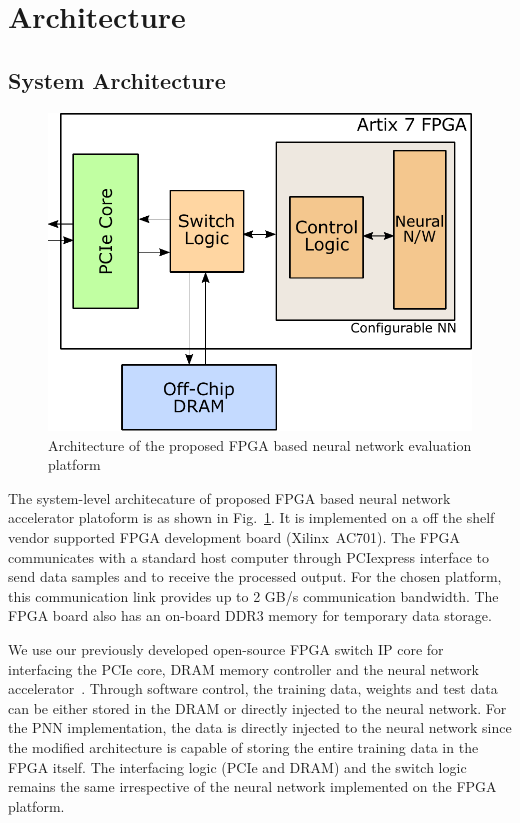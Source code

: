 \section{Architecture}
\label{sec_arch}


\subsection{System Architecture}

\begin{figure}[t]
\centering
   \includegraphics[height=0.7\columnwidth]{Figures/systemarch.pdf}
   \caption{Architecture of the proposed FPGA based neural network evaluation platform}
   \label{fig:sysArch}
\end{figure}

The system-level architecature of proposed FPGA based neural network accelerator platoform is as shown in Fig.~\ref{fig:sysArch}.
It is implemented on a off the shelf vendor supported FPGA development board (Xilinx~AC701).
The FPGA communicates with a standard host computer through PCIexpress interface to send data samples and to receive the processed output.
For the chosen platform, this communication link provides up to 2 GB/s communication bandwidth.
The FPGA board also has an on-board DDR3 memory for temporary data storage.

We use our previously developed open-source FPGA switch IP core for interfacing the PCIe core, DRAM memory controller and the neural network accelerator~\cite{blanked}.
Through software control, the training data, weights and test data can be either stored in the DRAM or directly injected to the neural network.
For the PNN implementation, the data is directly injected to the neural network since the modified architecture is capable of storing the entire training data in the FPGA itself.
The interfacing logic (PCIe and DRAM) and the switch logic remains the same irrespective of the neural network implemented on the FPGA platform.

